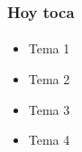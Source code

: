 \documentclass[aspectratio=169]{beamer}
\begin{document}
\Portada

\begin{frame}
  \frametitle{Hoy toca}
  \framesubtitle{}
  \begin{itemize}
    \item Tema 1
    \item Tema 2
    \item Tema 3
    \item Tema 4
  \end{itemize}
\end{frame}

\Dudas

\ifdefempty{\TextoCita}{}{\Cita{\TextoCita}{\FuenteCita}}

\Redes

\Despedida
\end{document}
